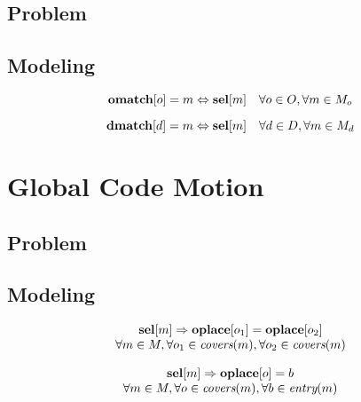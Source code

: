 \subsection{Problem}
\subsection{Modeling}

\begin{equation}
  \mVar{omatch}[o] = m \mEq \mVar{sel}[m]
  \mQuantSep
  \forall o \in \mOpSet,
  \forall m \in \mMatchSet[o]
  \labelEquation{operation-coverage}
\end{equation}

\begin{equation}
  \mVar{dmatch}[d] = m \mEq \mVar{sel}[m]
  \mQuantSep
  \forall d \in \mDataSet,
  \forall m \in \mMatchSet[d]
  \labelEquation{data-definitions}
\end{equation}



\section{Global Code Motion}
\subsection{Problem}
\subsection{Modeling}

\begin{equation}
  \begin{array}{c}
    \mVar{sel}[m] \mImp \mVar{oplace}[o_1] = \mVar{oplace}[o_2] \\
    \forall m \in \mMatchSet,
    \forall o_1 \in \mCovers(m),
    \forall o_2 \in \mCovers(m)
  \end{array}
  \labelEquation{operation-placement}
\end{equation}

\begin{equation}
  \begin{array}{c}
    \mVar{sel}[m] \mImp \mVar{oplace}[o] = b \\
    \forall m \in \mMatchSet,
    \forall o \in \mCovers(m),
    \forall b \in \mEntry(m)
  \end{array}
  \labelEquation{jump-placements}
\end{equation}

